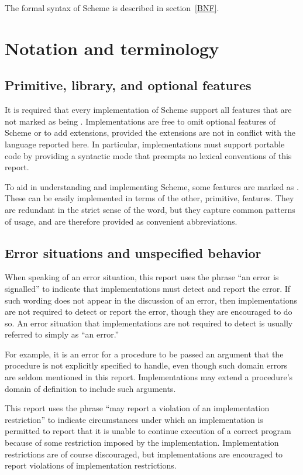 The formal syntax of Scheme is described in section~\ref{BNF}.


\section{Notation and terminology}


\subsection{Primitive, library, and optional features}
\label{qualifiers}

It is required that every implementation of Scheme support all
features that are not marked as being .  Implementations are
free to omit optional features of Scheme or to add extensions,
provided the extensions are not in conflict with the language reported
here.  In particular, implementations must support portable code by
providing a syntactic mode that preempts no lexical conventions of this
report.

To aid in understanding and implementing Scheme, some features are marked
as . These can be easily implemented in terms of the other,
primitive, features.  They are redundant in the strict sense of
the word, but they capture common patterns of usage, and are therefore
provided as convenient abbreviations.

\subsection{Error situations and unspecified behavior}

When speaking of an error situation, this report uses the phrase ``an
error is signalled'' to indicate that implementations must detect and
report the error.  If such wording does not appear in the discussion of
an error, then implementations are not required to detect or report the
error, though they are encouraged to do so.  An error situation that
implementations are not required to detect is usually referred to simply
as ``an error.''

\vest For example, it is an error for a procedure to be passed an argument that
the procedure is not explicitly specified to handle, even though such
domain errors are seldom mentioned in this report.  Implementations may
extend a procedure's domain of definition to include such arguments.

\vest This report uses the phrase ``may report a violation of an
implementation restriction'' to indicate circumstances under which an
implementation is permitted to report that it is unable to continue
execution of a correct program because of some restriction imposed by the
implementation.  Implementation restrictions are of course discouraged,
but implementations are encouraged to report violations of implementation
restrictions.

